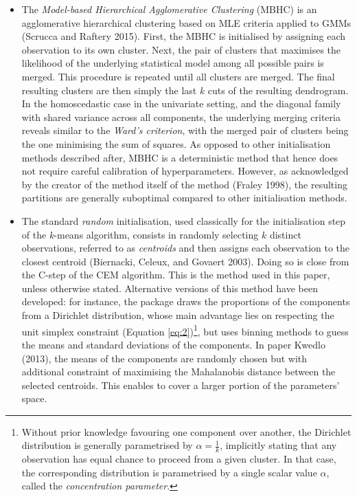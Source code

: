 \begin{itemize}
\item
  The \emph{Model-based Hierarchical Agglomerative Clustering} (MBHC) is
  an agglomerative hierarchical clustering based on MLE criteria applied to
  GMMs (Scrucca and Raftery 2015). First, the MBHC is
  initialised by assigning each observation to its own cluster. Next,
  the pair of clusters that maximises the likelihood of the underlying
  statistical model among all possible pairs is merged. This procedure
  is repeated until all clusters are merged. The final resulting
  clusters are then simply the last \(k\) cuts of the resulting
  dendrogram. In the homoscedastic case in the univariate setting, and the diagonal family with shared variance across all components, the underlying
  merging criteria reveals similar to the \emph{Ward's criterion}, with the
  merged pair of clusters being the one minimising the sum of squares.
  As opposed to other initialisation methods described after, MBHC is a
  deterministic method that hence does not require careful calibration of
  hyperparameters. However, as acknowledged by the creator of the method itself of the method (Fraley 1998), the resulting partitions are generally
  suboptimal compared to other initialisation methods.
\item
  The standard \emph{random} initialisation, used classically for the
  initialisation step of the \emph{k}-means algorithm, consists in randomly
  selecting \(k\) distinct observations, referred to as \emph{centroids} and
  then assigns each observation to the closest centroid
  (Biernacki, Celeux, and Govaert 2003). Doing so is close from the C-step of the CEM algorithm.
  This is the method used in this paper, unless otherwise stated. Alternative versions of this method have been developed: for instance, the package  draws the proportions of the components from a Dirichlet distribution, whose main advantage lies on respecting the unit simplex constraint (Equation \eqref{eq:2})\footnote{Without prior knowledge favouring one component over another, the Dirichlet distribution is generally parametrised by \(\alpha=\frac{1}{k}\), implicitly stating that any observation has equal chance to proceed from a given cluster. In that case, the corresponding distribution is parametrised by a single scalar value \(\alpha\), called the \emph{concentration parameter}.}, but uses binning methods to guess the means and standard deviations of the components. In paper Kwedlo (2013), the means of the components are randomly chosen but with additional constraint of maximising the Mahalanobis distance between the selected centroids. This enables to cover a larger portion of the parameters' space.

\end{itemize}
